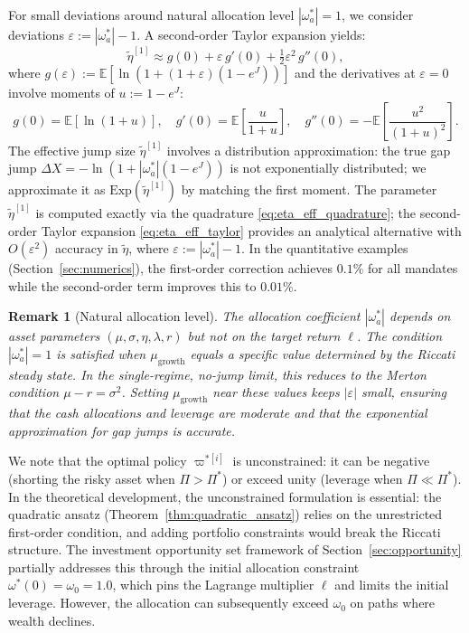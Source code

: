 \documentclass[11pt,a4paper]{article}
\numberwithin{equation}{section}
\newtheorem{remark}[theorem]{Remark}
\newcommand{\E}{\mathbb{E}}
\begin{document}
For small deviations around natural allocation level $|\omega^*_a|=1$, we consider deviations $\varepsilon := |\omega^*_a| - 1$. A second-order Taylor expansion yields:
\begin{equation}\label{eq:eta_eff_taylor}
\tilde\eta^{[1]} \approx g(0) + \varepsilon\, g'(0) + \tfrac{1}{2}\varepsilon^2\, g''(0),
\end{equation}
where $g(\varepsilon) := \E[\ln(1 + (1+\varepsilon)(1 - e^J))]$ and the derivatives at $\varepsilon = 0$ involve moments of $u := 1 - e^J$:
\[
g(0) = \E[\ln(1+u)], \quad g'(0) = \E\!\left[\frac{u}{1+u}\right], \quad g''(0) = -\E\!\left[\frac{u^2}{(1+u)^2}\right].
\]
The effective jump size $\tilde\eta^{[1]}$ involves a distribution approximation: the true gap jump $\Delta X = -\ln(1 + |\omega^*_a|(1 - e^J))$ is not exponentially distributed; we approximate it as $\mathrm{Exp}(\tilde\eta^{[1]})$ by matching the first moment. The parameter $\tilde\eta^{[1]}$ is computed exactly via the quadrature \eqref{eq:eta_eff_quadrature}; the second-order Taylor expansion \eqref{eq:eta_eff_taylor} provides an analytical alternative with $O(\varepsilon^{2})$ accuracy in $\tilde\eta$, where $\varepsilon := |\omega^*_a| - 1$. In the quantitative examples (Section~\ref{sec:numerics}), the first-order correction achieves $0.1\%$ for all mandates while the second-order term improves this to $0.01\%$. 


\begin{remark}[Natural allocation level]\label{rem:natural_alloc}
The allocation coefficient $|\omega^*_a|$ depends on asset parameters $(\mu, \sigma, \eta, \lambda, r)$ but not on the target return $\ell$.  The condition $|\omega^*_a| = 1$ is satisfied when $\mu_{\mathrm{growth}}$ equals a specific value determined by the Riccati steady state.  In the single-regime, no-jump limit, this reduces to the Merton condition $\mu - r = \sigma^2$. Setting $\mu_{\mathrm{growth}}$ near these values keeps $|\varepsilon|$ small, ensuring that the cash allocations and leverage are moderate and that the exponential approximation for gap jumps is accurate.
\end{remark}


We note that the optimal policy $\varpi^{*[i]}$ is unconstrained: it can be negative (shorting the risky asset when $\Pi > \Pi^*$) or exceed unity (leverage when $\Pi \ll \Pi^*$). In the theoretical development, the unconstrained formulation is essential: the quadratic ansatz (Theorem~\ref{thm:quadratic_ansatz}) relies on the unrestricted first-order condition, and adding portfolio constraints would break the Riccati structure.  The investment opportunity set framework of Section~\ref{sec:opportunity} partially addresses this through the initial allocation constraint $\omega^*(0) = \omega_0 =1.0$, which pins the Lagrange multiplier $\ell$ and limits the initial leverage.  However, the allocation can subsequently exceed $\omega_0$ on paths where wealth declines.
\end{document}
